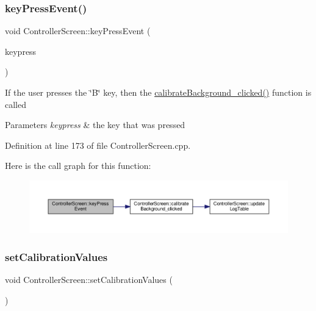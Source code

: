 \subsubsection{\texorpdfstring{key\+Press\+Event()}{keyPressEvent()}}
{\footnotesize\ttfamily void Controller\+Screen\+::key\+Press\+Event (\begin{DoxyParamCaption}\item[{Q\+Key\+Event $\ast$}]{keypress }\end{DoxyParamCaption})\hspace{0.3cm}{\ttfamily [override]}}

If the user presses the \char`\"{}\+B\char`\"{} key, then the \hyperlink{class_controller_screen_a7a71b9bc26a3de704f8613f3f2a08fb7}{calibrate\+Background\+\_\+clicked()} function is called


\begin{DoxyParams}{Parameters}
{\em keypress} & the key that was pressed \\
\hline
\end{DoxyParams}


Definition at line 173 of file Controller\+Screen.\+cpp.

Here is the call graph for this function\+:
\nopagebreak
\begin{figure}[H]
\begin{center}
\leavevmode
\includegraphics[width=350pt]{class_controller_screen_afbb0033f9be00fce83d54f2a49b9ba89_cgraph}
\end{center}
\end{figure}
\mbox{\label{class_controller_screen_ae4d6a51231fb1f6f8809ce3d036592bd}} 
\subsubsection{\texorpdfstring{set\+Calibration\+Values}{setCalibrationValues}}
{\footnotesize\ttfamily void Controller\+Screen\+::set\+Calibration\+Values (\begin{DoxyParamCaption}{ }\end{DoxyParamCaption})\hspace{0.3cm}{\ttfamily [slot]}}

